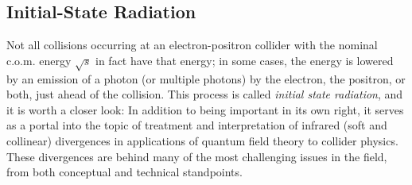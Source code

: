 \documentclass{ws-procs9x6}
\begin{document}
\subsection{Initial-State Radiation}
\label{sec:ISR}




Not all collisions occurring at an electron-positron collider with the nominal c.o.m. energy $\sqrt{s}$ in fact have that energy; in some cases, the energy is lowered by an emission of a photon (or multiple photons) by the electron, the positron, or both, just ahead of the collision. This process is called {\it initial state radiation}, and it is worth a closer look: In addition to being important in its own right, it serves as a portal into the topic of treatment and interpretation of infrared (soft and collinear) divergences in applications of quantum field theory to collider physics. These divergences are behind many of the most challenging issues in the field, from both conceptual and technical standpoints.  
\end{document}
